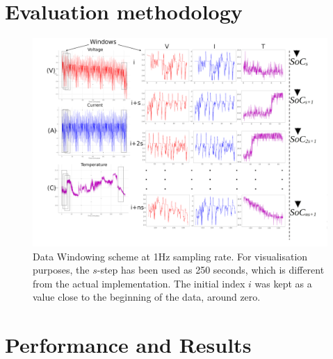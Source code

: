\documentclass[journal]{IEEEtranTIE}
\begin{document}
\section{Evaluation methodology} \label{sec:Meth}

    
    
    
    
    \begin{landscape}
        \begin{figure}[ht]
            \centering
            \includegraphics[width=\linewidth]{II_Body/images/windowing3f-A3.jpg}
            \caption{Data Windowing scheme at 1Hz sampling rate. For visualisation purposes, the $s$-step has been used as 250 seconds, which is different from the actual implementation. The initial index $i$ was kept as a value close to the beginning of the data, around zero.}
            \label{fig:Windowing3f}
        \end{figure}
    \end{landscape}
\section{Performance and Results}\label{sec:results}

% 
% 
\end{document}
